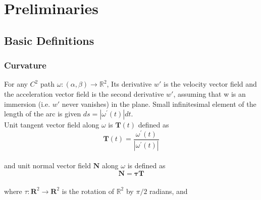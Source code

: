 \documentclass[oneside]{book}
\begin{document}
	
	
	
	
	
	
	
	
	
	
	
	
	
	
	
	
	\chapter{Preliminaries }
	\label{chap:c2}
	
	
	
	
	
	
	
	
	
	
	
	
	
	
	
	
	\section{\textbf{Basic Definitions}}\label{s:1}
	\subsection{Curvature}
	\label{ss:1}
	
	For any $C^{2}$ path $\omega:(\alpha, \beta) \rightarrow \mathbb{R}^{2}$, Its derivative $w'$ is the velocity vector field  and the acceleration vector field is the second derivative  $w'$, assuming that w is an immersion (i.e. $ w' $ never vanishes) in the plane. Small infinitesimal element of the length of the arc is given $d s=\left|\omega^{\prime}(t)\right| d t$.
	\\Unit tangent vector field along $\omega$ is $\mathbf{T}(t)$ defined as \\
	
	\begin{equation}
	\label{eq1}  
	\textbf{{T}}(t)=\frac{\omega^{\prime}(t)}{\left|\omega^{\prime}(t)\right|}
	\end{equation}  \\
	and unit normal vector field $\mathbf{N}$ along $\omega$ is defined as 
	\begin{equation}
	\label{eq2}  
	\mathbf{N}=\mathbf{\tau} \mathbf{T}
	\end{equation} \\
	where $ \tau: \mathbf{R}^{2} \rightarrow \mathbf{R}^{2}$ is the rotation of $\mathbb{R}^{2}$ by $\pi / 2$ radians, and
	
\end{document}
